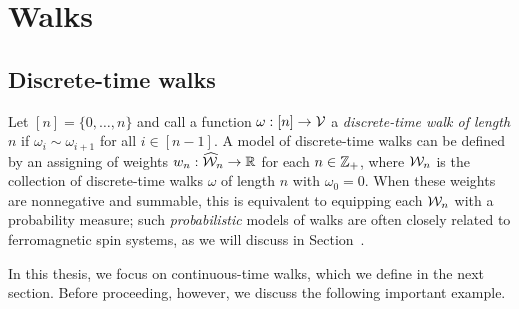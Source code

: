 
\section{Walks}

\subsection{Discrete-time walks}

Let $[n] = \{0,\ldots,n\}$ and call a function $\omega : [n]\rightarrow\mathcal{V}$
a \emph{discrete-time walk of length $n$} if $\omega_i \sim \omega_{i+1}$ for all
$i\in[n-1]$.
A model of discrete-time walks can be defined by an assigning of weights
$w_n : \widehat{\mathcal{W}}_n \rightarrow {\mathbb R}$ for each $n \in {\mathbb Z}_+$, where $\mathcal{W}_n$ is the
collection of discrete-time walks $\omega$ of length $n$ with $\omega_0 = 0$.
When these weights are nonnegative and summable, this is equivalent to
equipping each $\mathcal{W}_n$ with a probability measure; such \emph{probabilistic}
models of walks are often closely related to ferromagnetic spin systems,
as we will discuss in Section~\REF.

In this thesis, we focus on continuous-time walks, which we define in the next
section. Before proceeding, however, we discuss the following important example.

